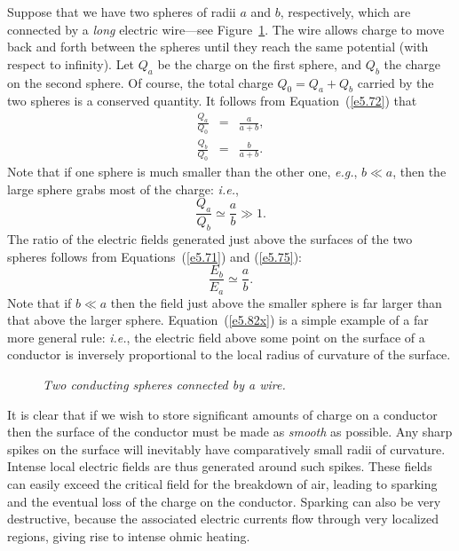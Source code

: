 Suppose that we have two spheres of radii $a$ and $b$, respectively, which are
connected by a {\em long}\/ electric wire---see Figure~\ref{fsphere2}. The wire allows charge to move back and forth between
the spheres until they reach the same potential (with respect to infinity).
Let $Q_a$ be the charge on the first sphere, and  $Q_b$ the charge on the
second sphere.
Of course, the total charge $Q_0= Q_a +Q_b$ carried by the two spheres is a conserved
quantity. It follows from Equation~(\ref{e5.72}) that
\begin{eqnarray}
\frac{Q_a}{Q_0}& =&  \frac{a}{a+b},\\[0.5ex]
\frac{Q_b}{Q_0} &=& \frac{b}{a+b}.
\end{eqnarray}
Note that if one sphere is much smaller than the other one, {\em e.g.}, $b\ll a$, then
the large sphere grabs most of the charge: {\em i.e.}, 
\begin{equation}\label{e5.75}
\frac{Q_a}{Q_b} \simeq \frac{a}{b} \gg 1.
\end{equation}
The ratio of the electric fields generated just above the surfaces of the two
spheres follows from Equations~(\ref{e5.71}) and (\ref{e5.75}):
\begin{equation}\label{e5.82x}
\frac{E_b}{E_a}\simeq \frac{a}{b}.
\end{equation}
Note that if $b\ll a$ then the field just above the smaller sphere
is far larger  than that  above the larger sphere.
Equation~(\ref{e5.82x}) is a simple  example of a far more general rule:  {\em i.e.}, 
the electric field above  some point on the
surface of a conductor is inversely proportional to
the local radius of curvature of the surface. 
\begin{figure}
\epsfysize=1.5in
\centerline{}
\caption{\em Two conducting spheres connected by a wire.}\label{fsphere2}
\end{figure}

It is clear that if we wish to store significant amounts of charge on a conductor
then the surface of the conductor must be made as {\em smooth}\/ as possible. Any sharp
spikes on the surface will inevitably
have comparatively small radii of curvature. Intense local electric fields are thus
generated around such spikes.  These fields can easily exceed the critical field for the breakdown of air,
leading to sparking and the eventual loss of the charge on the conductor. 
Sparking can also be very destructive, because the associated
electric  currents flow through very localized
regions, giving rise to intense ohmic heating.

